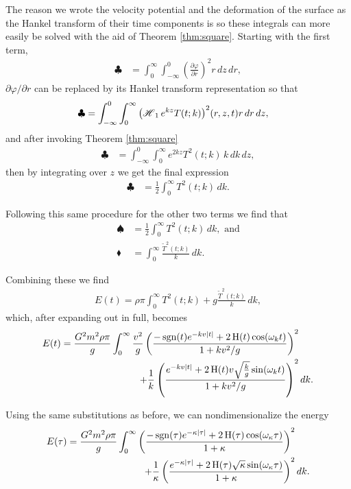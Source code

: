 The reason we wrote the velocity potential and the deformation of the surface as the Hankel transform of their time components is so these integrals can more easily be solved with the aid of Theorem \ref{thm:square}. Starting with the first term,
\begin{align*}
\clubsuit &= \int_0^\infty \int_{-\infty}^0 \left( \frac{\partial \varphi}{\partial r} \right)^2 r \, dz \, dr,
\end{align*}
$\partial \varphi / \partial r$ can be replaced by its Hankel transform representation so that
\begin{align*}
\clubsuit &= \int_{-\infty}^0 \int_0^\infty \Hank[1]{e^{kz}T(t;k)}^2(r,z,t) r \, dr \, dz,
\end{align*}
and after invoking Theorem \ref{thm:square}
\begin{align*}
\clubsuit &= \int_{-\infty}^0 \int_0^\infty e^{2kz} T^2(t;k) \, k \, dk \, dz,
\end{align*}
then by integrating over $z$ we get the final expression
\begin{align*}
\clubsuit &= \frac{1}{2} \int_0^\infty T^2(t;k) \, dk.
\end{align*}

Following this same procedure for the other two terms we find that
\begin{align*}
\spadesuit &= \frac{1}{2} \int_0^\infty T^2(t;k) \, dk, \text{ and} \\
\blacklozenge &= \int_0^\infty \frac{\widetilde{T}^2(t;k)}{k} \, dk.
\end{align*}

Combining these we find
\begin{align*}
E(t) = \rho \pi \int_0^\infty T^2(t;k) + g \frac{\widetilde{T}^2(t;k)}{k} \, dk,
\end{align*}
which, after expanding out in full, becomes
\begin{equation*}
\begin{split}
E(t) = \frac{G^2 m^2 \rho \pi}{g} \int_0^\infty \frac{v^2}{g} \left( \frac{- \sgn(t) e^{-kv |t|} + 2 \Heavi(t) \cos(\omega_k t)}{1+kv^2/g} \right)^2& \\
+ \frac{1}{k} \left( \frac{e^{-kv |t|} + 2 \Heavi(t) v \sqrt{\frac{k}{g}} \sin(\omega_k t)}{1+kv^2/g} \right)^2& \, dk.
\end{split}
\end{equation*}

Using the same substitutions as before, we can nondimensionalize the energy
\begin{equation}
\label{eq:fullenergynon}
\begin{split}
E(\tau) = \frac{G^2 m^2 \rho \pi}{g} \int_0^\infty \left( \frac{- \sgn(\tau) e^{-\kappa |\tau|} + 2 \Heavi(\tau) \cos(\omega_\kappa \tau)}{1+\kappa} \right)^2& \\
+ \frac{1}{\kappa} \left( \frac{e^{-\kappa |\tau|} + 2 \Heavi(\tau) \sqrt{\kappa} \sin(\omega_\kappa \tau)}{1+\kappa} \right)^2& \, dk.
\end{split}
\end{equation}

